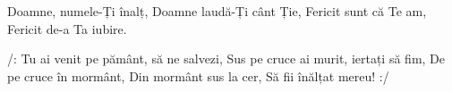 
\beginverse
Doamne, numele-Ți înalț,
Doamne laudă-Ți cânt Ție,
Fericit sunt că Te am,
Fericit de-a Ta iubire.
\endverse

\beginchorus
/: Tu ai venit pe pământ, să ne salvezi,
Sus pe cruce ai murit, iertați să fim,
De pe cruce în mormânt,
Din mormânt sus la cer,
Să fii înălțat mereu! :/
\endchorus

\endsong